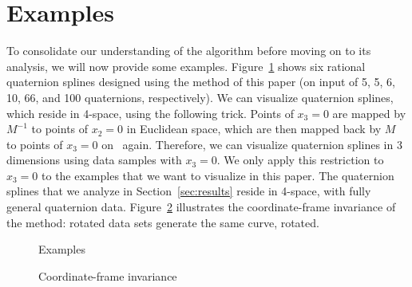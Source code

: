 \section{Examples}
\label{sec:eg}

To consolidate our understanding of the algorithm before moving on to its
analysis, we will now provide some examples.
Figure~\ref{fig:eg6} shows six rational quaternion splines designed using the
method of this paper (on input of 5, 5, 6, 10, 66, and 100 quaternions,
respectively).
We can visualize quaternion splines, which reside in 4-space,
using the following trick.
Points of $x_3=0$ are mapped by $M^{-1}$ 
to points of $x_2=0$ in Euclidean space,
which are then mapped back by $M$ to points of $x_3=0$ on \ again.
Therefore, we can visualize quaternion splines in 3 dimensions
using data samples with $x_3=0$.
We only apply this restriction to $x_3=0$ to the examples
that we want to visualize in this paper.
The quaternion splines that we analyze in Section~\ref{sec:results}
reside in 4-space, with fully general quaternion data.
Figure~\ref{fig:invariance} illustrates the coordinate-frame invariance
of the method: rotated data sets generate the same curve, rotated.

\begin{figure}
\vspace{5in}
\caption{Examples}
\label{fig:eg6}
\end{figure}

\begin{figure}
\vspace{3in}
\caption{Coordinate-frame invariance}
\label{fig:invariance}
\end{figure}


